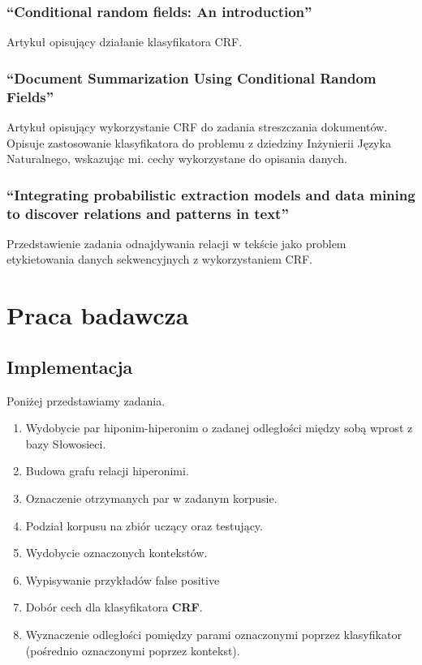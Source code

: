 \documentclass[a4paper,10pt]{report}
\begin{document}
\subsection{``Conditional random fields: An introduction'' \cite{wallach2004crf}}

Artykuł opisujący działanie klasyfikatora CRF.

\subsection{``Document Summarization Using Conditional Random Fields'' \cite{shen2007doccum}}

Artykuł opisujący wykorzystanie CRF do zadania streszczania dokumentów.
Opisuje zastosowanie klasyfikatora do problemu z dziedziny Inżynierii Języka Naturalnego, wskazując mi. cechy wykorzystane do opisania danych.  

\subsection{``Integrating probabilistic extraction models and data mining to discover relations and patterns in text'' \cite{culotta2006integrating}}

Przedstawienie zadania odnajdywania relacji w tekście jako problem etykietowania danych sekwencyjnych z wykorzystaniem CRF.


\chapter{Praca badawcza}

\section{Implementacja}

\noindent Poniżej przedstawiamy zadania.
\begin{enumerate}
 \item Wydobycie par hiponim-hiperonim o zadanej odległości między sobą wprost z bazy Słowosieci. %
 \item Budowa grafu relacji hiperonimi. %
 \item Oznaczenie otrzymanych par w zadanym korpusie. %
 \item Podział korpusu na zbiór uczący oraz testujący. %
 \item Wydobycie oznaczonych kontekstów. %
 \item Wypisywanie przykładów false positive %
 \item Dobór cech dla klasyfikatora \textbf{CRF}.  %
 \item Wyznaczenie odległości pomiędzy parami oznaczonymi poprzez klasyfikator (pośrednio oznaczonymi poprzez kontekst).  %
\end{enumerate}
\end{document}
